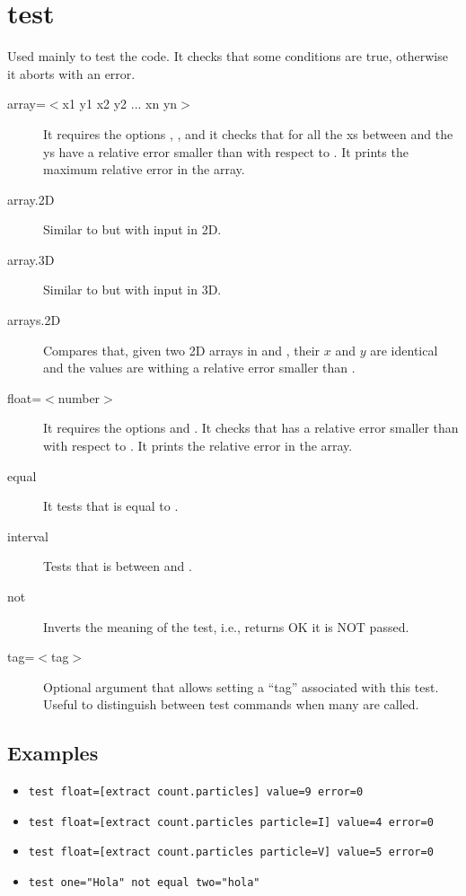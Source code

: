 
\section{test}
Used mainly to test the code. It checks that some conditions are true, otherwise it aborts with an error.

\begin{description}

\item[array=$<$x1 y1 x2 y2 ... xn yn$>$] It requires the options , ,  and  it checks that for all the xs between  and  the ys have a relative error smaller than  with respect to . It prints the maximum relative error in the array. 
\item[array.2D] Similar to  but with input in 2D.
\item[array.3D] Similar to  but with input in 3D.
\item[arrays.2D] Compares that, given two 2D arrays in  and , their $x$ and $y$ are identical and the values are withing a relative error smaller than .
\item[float=$<$number$>$]  It requires the options  and . It checks that  has a relative error smaller than  with respect to . It prints the relative error in the array. 
\item[equal] It tests that  is equal to .
\item[interval] Tests that  is between  and .
\item[not] Inverts the meaning of the test, i.e., returns OK it is NOT passed.
\item[tag=$<$tag$>$] Optional argument that allows setting a ``tag'' associated with this test. Useful to distinguish between test commands when many are called.
\end{description}

\subsection{Examples}
\begin{itemize}
\item \verb+test float=[extract count.particles] value=9 error=0+
\item \verb+test float=[extract count.particles particle=I] value=4 error=0+
\item \verb+test float=[extract count.particles particle=V] value=5 error=0+
\item \verb+test one="Hola" not equal two="hola"+
\end{itemize}
